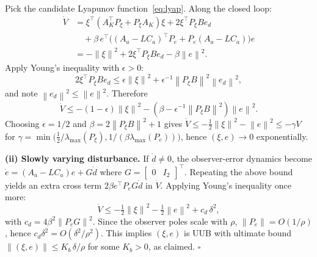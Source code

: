 \documentclass[conference]{IEEEtran}
\newcommand{\norm}[1]{\left\lVert#1\right\rVert}
\begin{document}
Pick the candidate Lyapunov function~\eqref{eq:lyap}. Along the closed
loop:
\begin{align*}
\dot V&=\xi^\top(A_K^\top P_\xi+P_\xi A_K)\xi+2\xi^\top P_\xi Be_d\\
       &\quad+\beta\,e^\top\bigl((A_a-LC_a)^\top P_e+P_e(A_a-LC_a)\bigr)e\\
       &=-\norm\xi^2+2\xi^\top P_\xi Be_d-\beta\norm e^2.
\end{align*}
Apply Young's inequality with $\epsilon>0$:
\begin{equation*}
2\xi^\top P_\xi Be_d\le \epsilon\norm\xi^2+\epsilon^{-1}\norm{P_\xi B}^2\norm{e_d}^2,
\end{equation*}
and note $\norm{e_d}^2\le\norm e^2$. Therefore
\begin{equation*}
\dot V\le-(1-\epsilon)\norm\xi^2-(\beta-\epsilon^{-1}\norm{P_\xi B}^2)\norm e^2.
\end{equation*}
Choosing $\epsilon=1/2$ and $\beta=2\norm{P_\xi B}^2+1$ gives
$\dot V\le-\tfrac12\norm\xi^2-\norm e^2\le -\gamma V$ for
$\gamma=\min\bigl(\tfrac12/\lambda_{\max}(P_\xi),
1/(\beta\lambda_{\max}(P_e))\bigr)$, hence $(\xi,e)\to 0$ exponentially.

\textbf{(ii) Slowly varying disturbance.} If $\dot d\ne 0$, the
observer-error dynamics become $\dot e=(A_a-LC_a)e+G\dot d$ where
$G=\begin{bmatrix}0&I_2\end{bmatrix}^\top$. Repeating the above bound
yields an extra cross term $2\beta e^\top P_e G\dot d$ in $\dot V$.
Applying Young's inequality once more:
\begin{equation*}
\dot V\le-\tfrac12\norm\xi^2-\tfrac12\norm e^2+c_d\,\delta^2,
\end{equation*}
with $c_d=4\beta^2\norm{P_eG}^2$. Since the observer poles scale with
$\rho$, $\norm{P_e}\!=\!O(1/\rho)$, hence $c_d\delta^2=O(\delta^2/\rho^2)$.
This implies $(\xi,e)$ is UUB with ultimate bound
$\norm{(\xi,e)}\le K_b\,\delta/\rho$ for some $K_b>0$, as claimed.
\hfill$\square$



\end{document}
